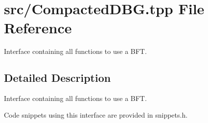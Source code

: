 \hypertarget{CompactedDBG_8tpp}{}\section{src/\+Compacted\+D\+BG.tpp File Reference}
\label{CompactedDBG_8tpp}


Interface containing all functions to use a B\+FT.  




\subsection{Detailed Description}
Interface containing all functions to use a B\+FT. 

Code snippets using this interface are provided in snippets.\+h. 